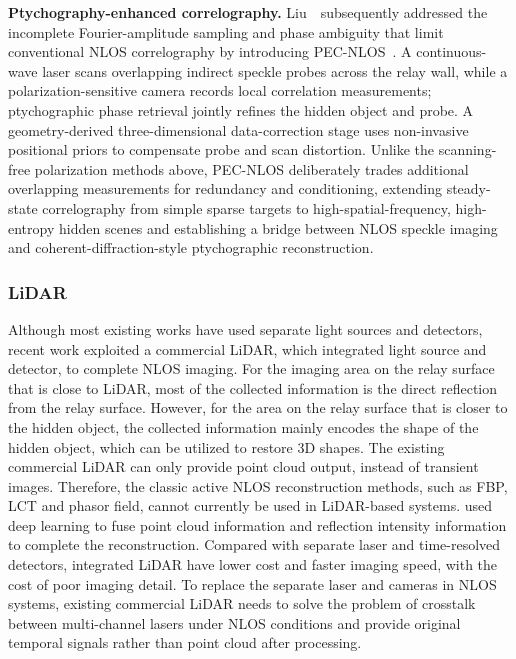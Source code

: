 \vspace{0.8mm}
\noindent \textbf{Ptychography-enhanced correlography.}
Liu~\etal~subsequently addressed the incomplete Fourier-amplitude sampling and phase ambiguity that limit conventional NLOS correlography by introducing PEC-NLOS~\cite{liuPtychographyCorrelographyNLOS2026}. A continuous-wave laser scans overlapping indirect speckle probes across the relay wall, while a polarization-sensitive camera records local correlation measurements; ptychographic phase retrieval jointly refines the hidden object and probe. A geometry-derived three-dimensional data-correction stage uses non-invasive positional priors to compensate probe and scan distortion. Unlike the scanning-free polarization methods above, PEC-NLOS deliberately trades additional overlapping measurements for redundancy and conditioning, extending steady-state correlography from simple sparse targets to high-spatial-frequency, high-entropy hidden scenes and establishing a bridge between NLOS speckle imaging and coherent-diffraction-style ptychographic reconstruction.

\subsubsection{LiDAR}
Although most existing works have used separate light sources and detectors, recent work\cite{zhuFastNonlineofsightImaging2021a} exploited a commercial LiDAR, which integrated light source and detector, to complete NLOS imaging. For the imaging area on the relay surface that is close to LiDAR, most of the collected information is the direct reflection from the relay surface. However, for the area on the relay surface that is closer to the hidden object, the collected information mainly encodes the shape of the hidden object, which can be utilized to restore 3D shapes. 
The existing commercial LiDAR can only provide point cloud output, instead of transient images. Therefore, the classic active NLOS reconstruction methods, such as FBP\cite{veltenRecoveringThreedimensionalShape2012}, LCT\cite{otooleConfocalNonlineofsightImaging2018} and phasor field\cite{liuVirtualWaveOptics2018}, cannot currently be used in LiDAR-based systems. \cite{zhuFastNonlineofsightImaging2021a} used deep learning to fuse point cloud information and reflection intensity information to complete the reconstruction.
Compared with separate laser and time-resolved detectors, integrated LiDAR have lower cost and faster imaging speed, with the cost of poor imaging detail.
To replace the separate laser and cameras in NLOS systems, existing commercial LiDAR needs to solve the problem of crosstalk between multi-channel lasers under NLOS conditions and provide original temporal signals rather than point cloud after processing.


